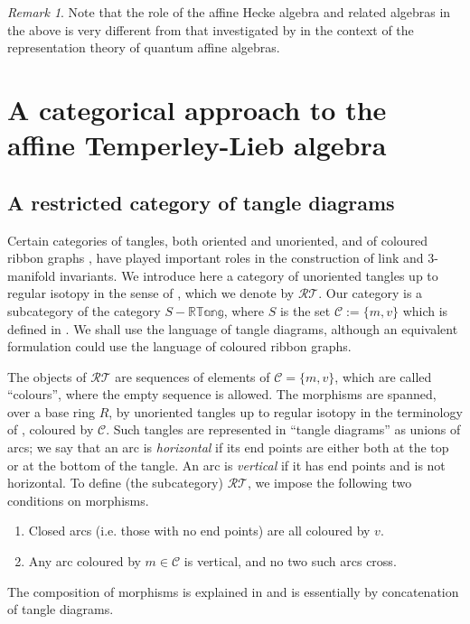 \documentclass[12pt]{amsart}
\theoremstyle{definition}
\theoremstyle{remark}
\newtheorem{remark}[theorem]{Remark}
\numberwithin{equation}{section}
\newcommand{\mc}{\mathcal}
\newcommand{\cC}{\mc C}
\newcommand{\RTC}{\mathcal{RT}}
\begin{document}
\begin{remark} Note that the role of the affine Hecke algebra and related algebras in the above is very different from that  investigated by \cite{CP} in the context of the representation theory of quantum affine algebras.
\end{remark}


\section{A categorical approach to the affine Temperley-Lieb algebra}\label{sect:cats}
\subsection{A restricted category of tangle diagrams}\label{sect:cat-RT}
%
%
Certain categories of tangles, both oriented and unoriented, \cite{FY} and of coloured ribbon graphs \cite{RT}, 
have played  important roles in the construction of link and $3$-manifold invariants. 
We introduce here a category of unoriented tangles up to regular isotopy in the sense of \cite{FY}, which we denote by $\RTC$. 
Our category is a subcategory of the category $S-\mathbb{RT}\mathbb{ang}$, where $S$ is the set $\cC:=\{m,v\}$
which is defined in \cite[Def. 3.1]{FY}. We shall use the language of tangle diagrams, although an equivalent formulation could use the language of coloured ribbon graphs. 
 
The objects of $\RTC$ are sequences of elements of $\cC=\{m, v\}$, which are called ``colours'',  where the empty sequence is allowed. 
The morphisms are spanned, over a base ring $R$, by unoriented tangles up to regular isotopy
in the terminology of \cite{FY}, coloured by $\cC$. Such tangles are represented in ``tangle diagrams'' as unions of arcs; we say that an arc 
is {\em horizontal} if  its end points are either both at the top or at the bottom of the tangle. An arc is
{\em vertical} if it has end points and is not horizontal. To define (the subcategory) $\RTC$, we impose the following two conditions on morphisms.
\begin{enumerate}
\item Closed arcs (i.e. those with no end points) are all coloured by $v$. 

\item Any arc coloured by $m\in\cC$ is vertical, and no two such arcs cross.
\end{enumerate}

The composition of morphisms is explained in \cite{FY} and is essentially by concatenation of tangle diagrams. 
\end{document}
